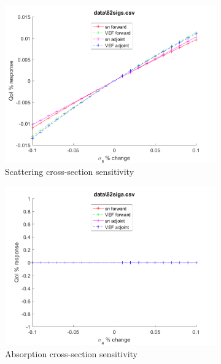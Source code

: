 \documentclass{article}
\begin{document}
\begin{figure}[H]
\begin{subfigure}{.5\textwidth}
  \includegraphics[width=.98\linewidth]{IanProposal/figures2/82sigsSens.png}
  \caption{Scattering cross-section sensitivity}
  \label{fig:sfig2}
\end{subfigure}%
\begin{subfigure}{.5\textwidth}
  \centering
  \includegraphics[width=.98\linewidth]{IanProposal/figures2/82sigaSens.png}
  \caption{Absorption cross-section sensitivity}
  \label{fig:sfig5}
\end{subfigure}%
\caption{}
\label{fig:fig}
\end{figure}
\newpage

\end{document}
